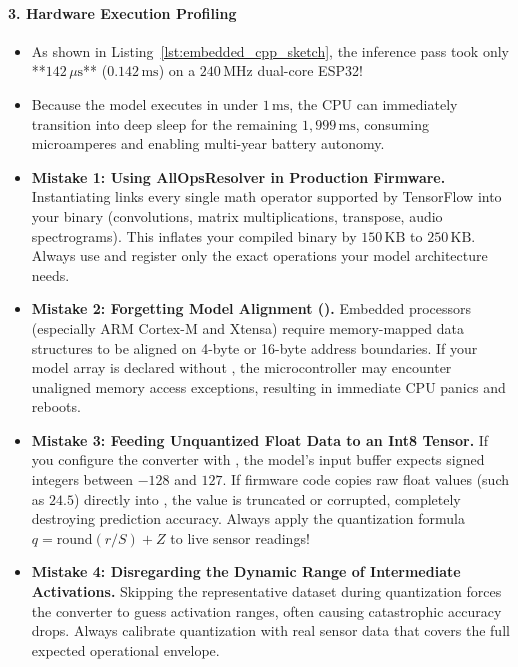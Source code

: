 \begin{iotbox}
\paragraph{3. Hardware Execution Profiling}
\begin{itemize}
    \item As shown in Listing~\ref{lst:embedded_cpp_sketch}, the inference pass took only **$142\,\mu\text{s}$** ($0.142\,\text{ms}$) on a $240\,\text{MHz}$ dual-core ESP32!
    \item Because the model executes in under $1\,\text{ms}$, the CPU can immediately transition into deep sleep for the remaining $1{,}999\,\text{ms}$, consuming microamperes and enabling multi-year battery autonomy.
\end{itemize}
\end{iotbox}

\begin{warning}
\begin{itemize}
    \item \textbf{Mistake 1: Using AllOpsResolver in Production Firmware.}
    Instantiating  links every single math operator supported by TensorFlow into your binary (convolutions, matrix multiplications, transpose, audio spectrograms). This inflates your compiled binary by $150\,\text{KB}$ to $250\,\text{KB}$. Always use  and register only the exact operations your model architecture needs.
    \item \textbf{Mistake 2: Forgetting Model Alignment ().}
    Embedded processors (especially ARM Cortex-M and Xtensa) require memory-mapped data structures to be aligned on 4-byte or 16-byte address boundaries. If your model array is declared without , the microcontroller may encounter unaligned memory access exceptions, resulting in immediate CPU panics and reboots.
    \item \textbf{Mistake 3: Feeding Unquantized Float Data to an Int8 Tensor.}
    If you configure the converter with , the model's input buffer expects signed integers between $-128$ and $127$. If firmware code copies raw float values (such as $24.5$) directly into , the value is truncated or corrupted, completely destroying prediction accuracy. Always apply the quantization formula $q = \text{round}(r / S) + Z$ to live sensor readings!
    \item \textbf{Mistake 4: Disregarding the Dynamic Range of Intermediate Activations.}
    Skipping the representative dataset during quantization forces the converter to guess activation ranges, often causing catastrophic accuracy drops. Always calibrate quantization with real sensor data that covers the full expected operational envelope.
\end{itemize}
\end{warning}

